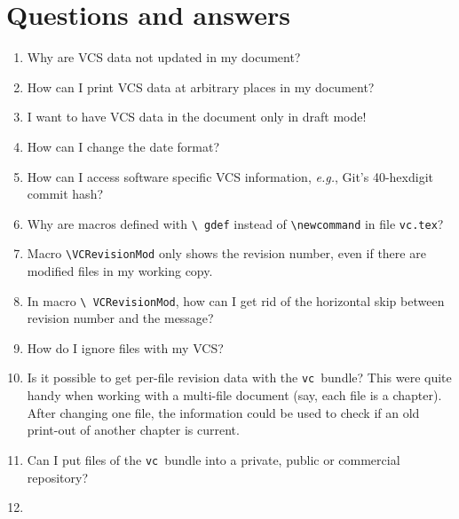 \documentclass[11pt]{article}
\newcommand*{\pkg}{\texttt{vc}}
\begin{document}
\section{Questions and answers}
\label{sec:qa}

\newcommand*{\qfont}{\sffamily\bfseries}
\newcommand*{\question}[2]{%
  \expandafter\gdef\csname #1\endcsname{#2}%
\item\label{#1}\csname #1\endcsname%
}
\newcommand{\answer}[1]{%
  \medskip\par
  {\noindent\qfont\ref{#1}.~\csname #1\endcsname\par}
  \nobreak\noindent\ignorespaces%
}

\begin{enumerate}
  \qfont%
  \setlength{\itemsep}{4pt}%
  \setlength{\parskip}{0pt}%

\question{vcHowOften}{How often do I need to run the script \texttt{vc}?
  Every time before \TeX\ is run?}

\question{vcWhyNoData}{Why are VCS data not updated in my document?}

\question{vcHowToInsert}{How can I print VCS data at arbitrary places in
  my document?}

\question{vcDraftMode}{I want to have VCS data in the document only in
  draft mode!}

\question{vcDateFormat}{How can I change the date format?}

\question{vcVcsSpecifics}{How can I access software specific VCS
  information, \emph{e.g.}, Git's 40-hexdigit commit hash?}

\question{vcWhyGdef}{Why are macros defined with \texttt{\textbackslash
    gdef} instead of \texttt{\textbackslash newcommand} in file
  \texttt{vc.tex}?}

\question{vcVCRevisionMod-m}{Macro \texttt{\textbackslash VCRevisionMod}
  only shows the revision number, even if there are modified files in my
  working copy.}

\question{vcVCRevisionMod-unskip}{In macro \texttt{\textbackslash
    VCRevisionMod}, how can I get rid of the horizontal skip between
  revision number and the message?}

\question{vcIgnoreFiles}{How do I ignore files with my VCS?}

\question{vcPerFile}{Is it possible to get per-file revision data with
  the \pkg\ bundle?  This were quite handy when working with a
  multi-file document (say, each file is a chapter).  After changing one
  file, the information could be used to check if an old print-out of
  another chapter is current.}

\question{vcLicense}{Can I put files of the \pkg\ bundle into a private,
  public or commercial repository?}
\end{enumerate}
\end{document}
